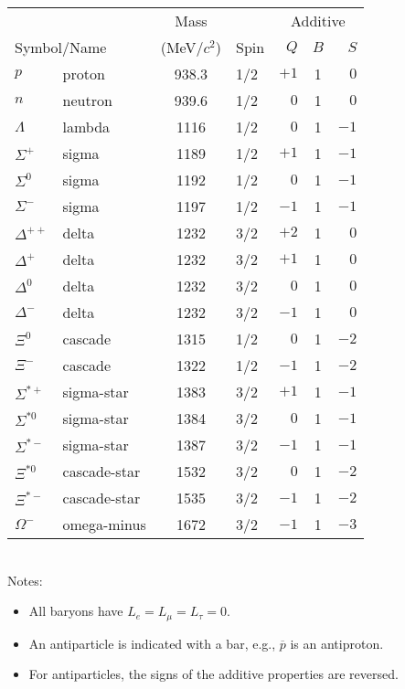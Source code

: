 \documentclass[11pt]{article}
\begin{document}
\begin{table}[htbp]
\begin{tabular}[tbp]{llclrcr}
&& Mass && \multicolumn{3}{|c}{Additive} \\
\multicolumn{2}{l}{Symbol/Name} & (MeV/$c^2$) & Spin\hspace{4mm} &
\multicolumn{1}{|r}{$Q$}
 & $B$ & $S$ \\
\hline\hline
$p$           & proton       & 938.3 & 1/2 & $+1$ & 1 & $0$  \\
$n$           & neutron      & 939.6 & 1/2 & $ 0$ & 1 & $0$  \\[0.5ex]
$\Lambda$     & lambda       & 1116  & 1/2 & $ 0$ & 1 & $-1$ \\
$\Sigma^+$    & sigma        & 1189  & 1/2 & $+1$ & 1 & $-1$ \\
$\Sigma^0$    & sigma        & 1192  & 1/2 & $ 0$ & 1 & $-1$ \\
$\Sigma^-$    & sigma        & 1197  & 1/2 & $-1$ & 1 & $-1$ \\[0.5ex]
$\Delta^{++}$ & delta        & 1232  & 3/2 & $+2$ & 1 & $ 0$ \\
$\Delta^+$    & delta        & 1232  & 3/2 & $+1$ & 1 & $ 0$ \\
$\Delta^0$    & delta        & 1232  & 3/2 & $ 0$ & 1 & $ 0$ \\
$\Delta^-$    & delta        & 1232  & 3/2 & $-1$ & 1 & $ 0$ \\[0.5ex]
$\Xi^0$       & cascade      & 1315  & 1/2 & $ 0$ & 1 & $-2$ \\
$\Xi^-$       & cascade      & 1322  & 1/2 & $-1$ & 1 & $-2$ \\[0.5ex]
$\Sigma^{*+}$ & sigma-star   & 1383  & 3/2 & $+1$ & 1 & $-1$ \\
$\Sigma^{*0}$ & sigma-star   & 1384  & 3/2 & $ 0$ & 1 & $-1$ \\
$\Sigma^{*-}$ & sigma-star   & 1387  & 3/2 & $-1$ & 1 & $-1$ \\[0.5ex]
$\Xi^{*0}$    & cascade-star & 1532  & 3/2 & $ 0$ & 1 & $-2$ \\
$\Xi^{*-}$    & cascade-star & 1535  & 3/2 & $-1$ & 1 & $-2$ \\
$\Omega^-$    & omega-minus  & 1672  & 3/2 & $-1$ & 1 & $-3$ \\
\hline
\end{tabular}\\[0.5ex]
Notes:
\vspace{-4mm}
\begin{itemize}
\setlength{\itemsep}{-2mm}
\item All baryons have $L_e = L_\mu = L_\tau = 0$.
\item An antiparticle is indicated with a bar, e.g.,
$\overline p$ is an antiproton.
\item For antiparticles, the signs of the additive properties are reversed.
\end{itemize}
\end{table}
\end{document}
